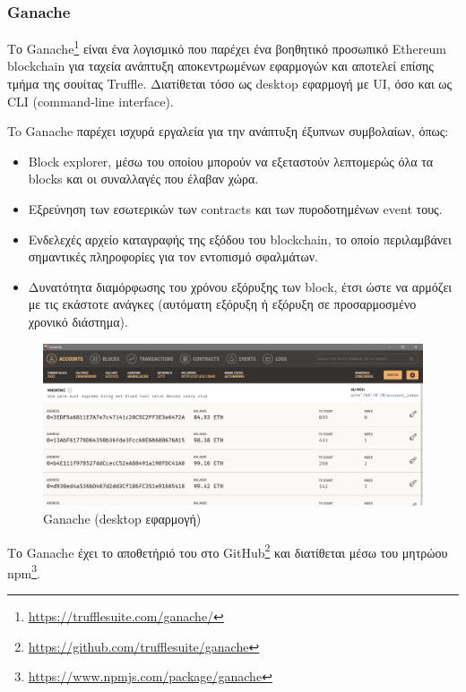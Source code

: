 \subsubsection{Ganache} \label{subsection:4-2-3-2-ganache}


Το Ganache\footnote{\url{https://trufflesuite.com/ganache/}} είναι ένα λογισμικό που παρέχει ένα βοηθητικό προσωπικό Ethereum blockchain για ταχεία ανάπτυξη αποκεντρωμένων εφαρμογών και αποτελεί επίσης τμήμα της σουίτας Truffle. Διατίθεται τόσο ως desktop εφαρμογή με UI, όσο και ως CLI (command-line interface).

To Ganache παρέχει ισχυρά εργαλεία για την ανάπτυξη έξυπνων συμβολαίων, όπως:
\begin{itemize}
	\item Block explorer, μέσω του οποίου μπορούν να εξεταστούν λεπτομερώς όλα τα blocks και οι συναλλαγές που έλαβαν χώρα.
	\item Εξρεύνηση των εσωτερικών των contracts και των πυροδοτημένων event τους.
	\item Ενδελεχές αρχείο καταγραφής της εξόδου του blockchain, το οποίο περιλαμβάνει σημαντικές πληροφορίες για τον εντοπισμό σφαλμάτων.
	\item Δυνατότητα διαμόρφωσης του χρόνου εξόρυξης των block, έτσι ώστε να αρμόζει με τις εκάστοτε ανάγκες (αυτόματη εξόρυξη ή εξόρυξη σε προσαρμοσμένο χρονικό διάστημα).
\end{itemize}

\begin{figure}[H]
	\centering
	\includegraphics[width=.95\textwidth]{assets/figures/chapter-4/4.2.ganache-gui}
	\caption{Ganache (desktop εφαρμογή)}
\end{figure}

Το Ganache έχει το αποθετήριό του στο GitHub\footnote{\url{https://github.com/trufflesuite/ganache}} και διατίθεται μέσω του μητρώου npm\footnote{\url{https://www.npmjs.com/package/ganache}}.